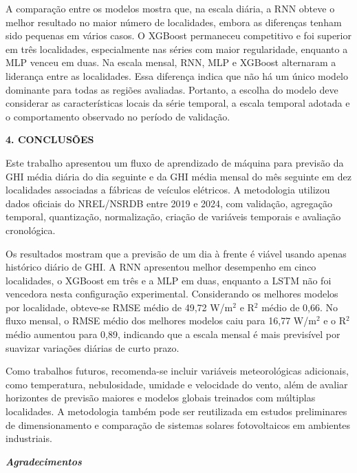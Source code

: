\documentclass[12pt,a4paper]{article}
\begin{document}
\vspace{6pt}

A comparação entre os modelos mostra que, na escala diária, a RNN obteve o melhor resultado no maior número de localidades, embora as diferenças tenham sido pequenas em vários casos. O XGBoost permaneceu competitivo e foi superior em três localidades, especialmente nas séries com maior regularidade, enquanto a MLP venceu em duas. Na escala mensal, RNN, MLP e XGBoost alternaram a liderança entre as localidades. Essa diferença indica que não há um único modelo dominante para todas as regiões avaliadas. Portanto, a escolha do modelo deve considerar as características locais da série temporal, a escala temporal adotada e o comportamento observado no período de validação.

\vspace{12pt}

\noindent\textbf{4. CONCLUSÕES}

Este trabalho apresentou um fluxo de aprendizado de máquina para previsão da GHI média diária do dia seguinte e da GHI média mensal do mês seguinte em dez localidades associadas a fábricas de veículos elétricos. A metodologia utilizou dados oficiais do NREL/NSRDB entre 2019 e 2024, com validação, agregação temporal, quantização, normalização, criação de variáveis temporais e avaliação cronológica.

Os resultados mostram que a previsão de um dia à frente é viável usando apenas histórico diário de GHI. A RNN apresentou melhor desempenho em cinco localidades, o XGBoost em três e a MLP em duas, enquanto a LSTM não foi vencedora nesta configuração experimental. Considerando os melhores modelos por localidade, obteve-se RMSE médio de 49,72 W/m$^2$ e R$^2$ médio de 0,66. No fluxo mensal, o RMSE médio dos melhores modelos caiu para 16,77 W/m$^2$ e o R$^2$ médio aumentou para 0,89, indicando que a escala mensal é mais previsível por suavizar variações diárias de curto prazo.

Como trabalhos futuros, recomenda-se incluir variáveis meteorológicas adicionais, como temperatura, nebulosidade, umidade e velocidade do vento, além de avaliar horizontes de previsão maiores e modelos globais treinados com múltiplas localidades. A metodologia também pode ser reutilizada em estudos preliminares de dimensionamento e comparação de sistemas solares fotovoltaicos em ambientes industriais.

\vspace{12pt}

\noindent\textbf{\textit{Agradecimentos}}
\end{document}
